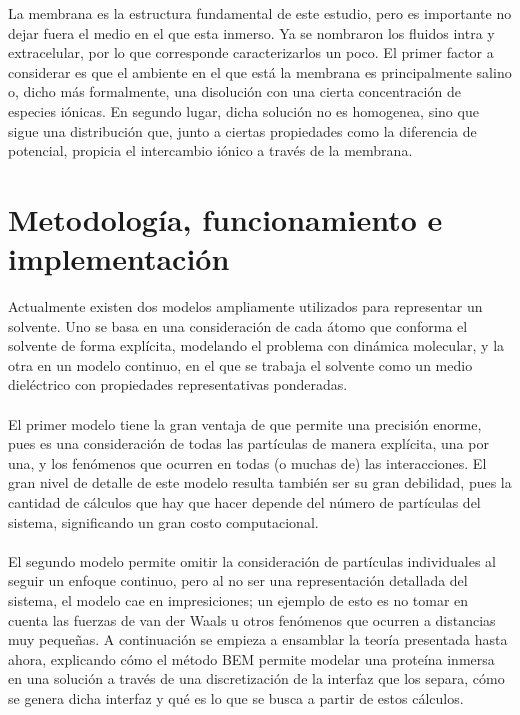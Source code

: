 \documentclass[12pt, oneside, numbers, spanish]{ezthesis}
\numberwithin{equation}{section}
\begin{document}
La membrana es la estructura fundamental de este estudio, pero es importante no dejar fuera el medio en el que esta inmerso. Ya se nombraron los fluidos intra y extracelular, por lo que corresponde caracterizarlos un poco. El primer factor a considerar es que el ambiente en el que está la membrana es principalmente salino o, dicho más formalmente, una disolución con una cierta concentración de especies iónicas. En segundo lugar, dicha solución no es homogenea, sino que sigue una distribución que, junto a ciertas propiedades como la diferencia de potencial, propicia el intercambio iónico a través de la membrana.






\chapter{Metodología, funcionamiento e implementación}\label{Chap:Method}
Actualmente existen dos modelos ampliamente utilizados para representar un solvente. Uno se basa en una consideración de cada átomo que conforma el solvente de forma explícita, modelando el problema con dinámica molecular, y la otra en un modelo continuo, en el que se trabaja el solvente como un medio dieléctrico con propiedades representativas ponderadas.\\\\
El primer modelo tiene la gran ventaja de que permite una precisión enorme, pues es una consideración de todas las partículas de manera explícita, una por una, y los fenómenos que ocurren en todas (o muchas de) las interacciones. El gran nivel de detalle de este modelo resulta también ser su gran debilidad, pues la cantidad de cálculos que hay que hacer depende del número de partículas del sistema, significando un gran costo computacional.\\\\
El segundo modelo permite omitir la consideración de partículas individuales al seguir un enfoque continuo, pero al no ser una representación detallada del sistema, el modelo cae en impresiciones; un ejemplo de esto es no tomar en cuenta las fuerzas de van der Waals u otros fenómenos que ocurren a distancias muy pequeñas. A continuación se empieza a ensamblar la teoría presentada hasta ahora, explicando cómo el método BEM permite modelar una proteína inmersa en una solución a través de una discretización de la interfaz que los separa, cómo se genera dicha interfaz y qué es lo que se busca a partir de estos cálculos.
\end{document}
